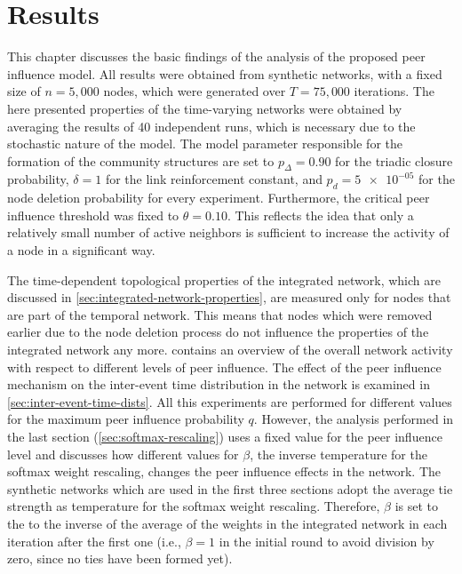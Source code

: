 \chapter{Results}
\label{cha:results}


This chapter discusses the basic findings of the analysis of the proposed peer influence model.
All results were obtained from synthetic networks, with a fixed size of \( n = 5,000 \) nodes, which were generated over \( T = 75,000 \) iterations.
The here presented properties of the time-varying networks were obtained by averaging the results of 40 independent runs, which is necessary due to the stochastic nature of the model.
The model parameter responsible for the formation of the community structures are set to \( p_{\Delta} = 0.90 \) for the triadic closure probability, \( \delta = 1 \) for the link reinforcement constant, and \( p_{d} = \num{5e-05} \) for the node deletion probability for every experiment.
Furthermore, the critical peer influence threshold was fixed to \( \theta = 0.10 \).
This reflects the idea that only a relatively small number of active neighbors is sufficient to increase the activity of a node in a significant way.

The time-dependent topological properties of the integrated network, which are discussed in \cref{sec:integrated-network-properties}, are measured only for nodes that are part of the temporal network.
This means that nodes which were removed earlier due to the node deletion process do not influence the properties of the integrated network any more.
 contains an overview of the overall network activity with respect to different levels of peer influence.
The effect of the peer influence mechanism on the inter-event time distribution in the network is examined in \cref{sec:inter-event-time-dists}.
All this experiments are performed for different values for the maximum peer influence probability \( q \).
However, the analysis performed in the last section (\cref{sec:softmax-rescaling}) uses a fixed value for the peer influence level and discusses how different values for \( \beta \), the inverse temperature for the softmax weight rescaling, changes the peer influence effects in the network.
The synthetic networks which are used in the first three sections adopt the average tie strength as temperature for the softmax weight rescaling.
Therefore, \( \beta \) is set to the to the inverse of the average of the weights in the integrated network in each iteration after the first one (i.e., \( \beta = 1 \) in the initial round to avoid division by zero, since no ties have been formed yet).


